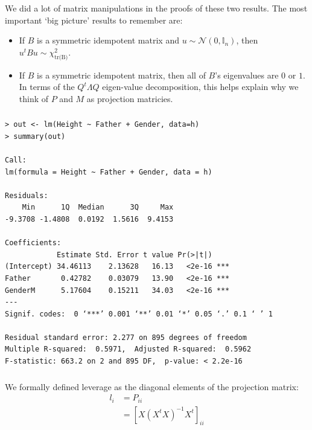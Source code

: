 \begin{frame}[fragile] \frametitle{}

We did a lot of matrix manipulations in the proofs of these
two results. The most important `big picture' results to
remember are:

\begin{itemize}
\item If $B$ is a symmetric idempotent matrix and
$u \sim \mathcal{N} (0, \mathbb{I}_n)$, then
$u^t B u \sim \chi^2_{\text{tr(B)}}$.
\item If $B$ is a symmetric idempotent matrix, then
all of $B$'s eigenvalues are $0$ or $1$. In terms of
the $Q^t \Lambda Q$ eigen-value decomposition, this
helps explain why we think of $P$ and $M$ as projection
matricies.
\end{itemize}

\end{frame}

\begin{frame}[fragile] \frametitle{}

\footnotesize

\begin{verbatim}
> out <- lm(Height ~ Father + Gender, data=h)
> summary(out)

Call:
lm(formula = Height ~ Father + Gender, data = h)

Residuals:
    Min      1Q  Median      3Q     Max
-9.3708 -1.4808  0.0192  1.5616  9.4153

Coefficients:
            Estimate Std. Error t value Pr(>|t|)
(Intercept) 34.46113    2.13628   16.13   <2e-16 ***
Father       0.42782    0.03079   13.90   <2e-16 ***
GenderM      5.17604    0.15211   34.03   <2e-16 ***
---
Signif. codes:  0 ‘***’ 0.001 ‘**’ 0.01 ‘*’ 0.05 ‘.’ 0.1 ‘ ’ 1

Residual standard error: 2.277 on 895 degrees of freedom
Multiple R-squared:  0.5971,  Adjusted R-squared:  0.5962
F-statistic: 663.2 on 2 and 895 DF,  p-value: < 2.2e-16
\end{verbatim}
\end{frame}

\begin{frame}[fragile] \frametitle{}

We formally defined leverage as the diagonal
elements of the projection matrix:
\begin{align*}
l_i &= P_{ii} \\
&= \left[ X (X^t X)^{-1} X^t \right]_{ii}
\end{align*}

\end{frame}

